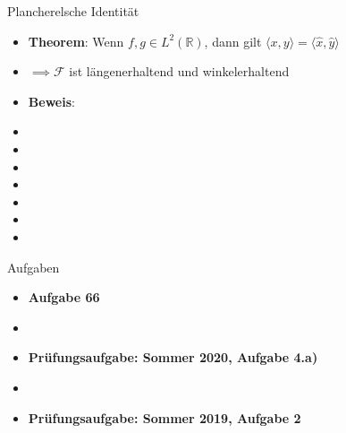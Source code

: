 \documentclass[14pt, aspectratio=169, handout]{beamer}
\begin{document}
\begin{frame}{Plancherelsche Identität}
    \begin{itemize}
    \item \textbf{Theorem}: Wenn $f,g \in L^2(\mathbb{R})$, dann gilt $\langle x, y\rangle = \langle \hat{x}, \hat{y}\rangle$
    \item[] $\implies \mathcal{F}$ ist längenerhaltend und winkelerhaltend
    \item \textbf{Beweis}:
    \item[]
    \item[]
    \item[]
    \item[]
    \item[]
    \item[]
    \item[]
\end{itemize}
\end{frame}

\begin{frame}{Aufgaben}
    \begin{itemize}
        \item \textbf{Aufgabe 66}
        \item[]
        \item \textbf{Prüfungsaufgabe: Sommer 2020, Aufgabe 4.a)}
        \item[]
        \item \textbf{Prüfungsaufgabe: Sommer 2019, Aufgabe 2}
    \end{itemize}
\end{frame}
\end{document}
